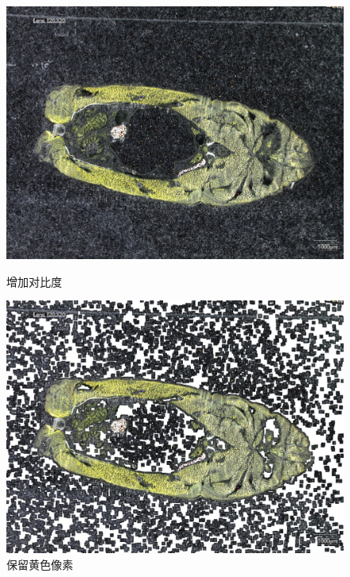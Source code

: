 \begin{figure}[H]
    \centering
    \begin{minipage}{0.45\textwidth}
        \centering
        \includegraphics[width=\textwidth]{./fig/threshold/enhanced_image.jpg}
        \caption{增加对比度}
        \label{fig:enhanced_image}
    \end{minipage}
    \begin{minipage}{0.45\textwidth}
        \centering
        \includegraphics[width=\textwidth]{./fig/threshold/yellowpic.jpg}
        \caption{保留黄色像素}
        \label{fig:yellowpic}
    \end{minipage}
\end{figure}


